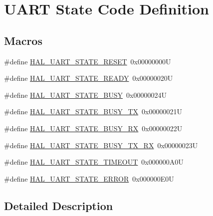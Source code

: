 \hypertarget{group___u_a_r_t___state___definition}{}\section{U\+A\+RT State Code Definition}
\label{group___u_a_r_t___state___definition}
\subsection*{Macros}
\begin{DoxyCompactItemize}
\item 
\#define \mbox{\hyperlink{group___u_a_r_t___state___definition_gacd81aeb745b71fc1c121cc686369600d}{H\+A\+L\+\_\+\+U\+A\+R\+T\+\_\+\+S\+T\+A\+T\+E\+\_\+\+R\+E\+S\+ET}}~0x00000000U
\item 
\#define \mbox{\hyperlink{group___u_a_r_t___state___definition_ga5f9ebc1c0e62dbad395ecf020e88bce9}{H\+A\+L\+\_\+\+U\+A\+R\+T\+\_\+\+S\+T\+A\+T\+E\+\_\+\+R\+E\+A\+DY}}~0x00000020U
\item 
\#define \mbox{\hyperlink{group___u_a_r_t___state___definition_gabe7a46b4b59e60aa480bdf2aa4c2fd8e}{H\+A\+L\+\_\+\+U\+A\+R\+T\+\_\+\+S\+T\+A\+T\+E\+\_\+\+B\+U\+SY}}~0x00000024U
\item 
\#define \mbox{\hyperlink{group___u_a_r_t___state___definition_gabfe9c686182148f2ecd8527d31576163}{H\+A\+L\+\_\+\+U\+A\+R\+T\+\_\+\+S\+T\+A\+T\+E\+\_\+\+B\+U\+S\+Y\+\_\+\+TX}}~0x00000021U
\item 
\#define \mbox{\hyperlink{group___u_a_r_t___state___definition_ga7e0aa32633802a0b89a96df4909ededf}{H\+A\+L\+\_\+\+U\+A\+R\+T\+\_\+\+S\+T\+A\+T\+E\+\_\+\+B\+U\+S\+Y\+\_\+\+RX}}~0x00000022U
\item 
\#define \mbox{\hyperlink{group___u_a_r_t___state___definition_ga8668588bb9f40ce6ef0d4174a7144a39}{H\+A\+L\+\_\+\+U\+A\+R\+T\+\_\+\+S\+T\+A\+T\+E\+\_\+\+B\+U\+S\+Y\+\_\+\+T\+X\+\_\+\+RX}}~0x00000023U
\item 
\#define \mbox{\hyperlink{group___u_a_r_t___state___definition_ga8fb45af1ff5413abde026eba4ecf264d}{H\+A\+L\+\_\+\+U\+A\+R\+T\+\_\+\+S\+T\+A\+T\+E\+\_\+\+T\+I\+M\+E\+O\+UT}}~0x000000\+A0U
\item 
\#define \mbox{\hyperlink{group___u_a_r_t___state___definition_gacbe168f8945e38c90d622982ee1300aa}{H\+A\+L\+\_\+\+U\+A\+R\+T\+\_\+\+S\+T\+A\+T\+E\+\_\+\+E\+R\+R\+OR}}~0x000000\+E0U
\end{DoxyCompactItemize}


\subsection{Detailed Description}



